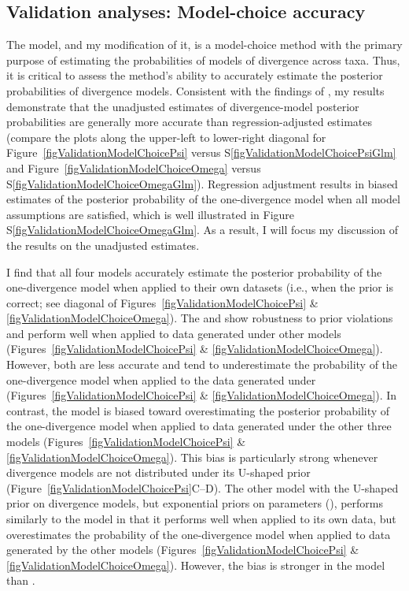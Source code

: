 \subsection{Validation analyses: Model-choice accuracy}
The \msb model, and my modification of it, is a model-choice method
with the primary purpose of estimating the probabilities of models
of divergence across taxa.
Thus, it is critical to assess the method's ability to accurately
estimate the posterior probabilities of divergence models.
Consistent with the findings of \citet{Oaks2012}, my results demonstrate that
the unadjusted estimates of divergence-model posterior probabilities are
generally more accurate than regression-adjusted estimates
(compare the plots along the upper-left to lower-right diagonal for
Figure~\ref{figValidationModelChoicePsi} versus
S\ref{figValidationModelChoicePsiGlm} and
Figure~\ref{figValidationModelChoiceOmega} versus
S\ref{figValidationModelChoiceOmegaGlm}).
Regression adjustment results in biased estimates of the posterior probability
of the one-divergence model when all model assumptions are satisfied, which is
well illustrated in Figure S\ref{figValidationModelChoiceOmegaGlm}.
As a result, I will focus my discussion of the results on the unadjusted
estimates.

I find that all four models accurately estimate the posterior probability of
the one-divergence model when applied to their own datasets (i.e., when the
prior is correct; see diagonal of Figures~\ref{figValidationModelChoicePsi} \&
\ref{figValidationModelChoiceOmega}).
The \modelUniform and \modelDPP show robustness to prior violations and
perform well when applied to data generated under other models
(Figures~\ref{figValidationModelChoicePsi} \&
\ref{figValidationModelChoiceOmega}).
However, both are less accurate and tend to underestimate the probability of the
one-divergence model when applied to the data generated under \modelUshaped
(Figures~\ref{figValidationModelChoicePsi} \&
\ref{figValidationModelChoiceOmega}).
In contrast, the \modelOld model is biased toward overestimating the posterior
probability of the one-divergence model when applied to data generated under
the other three models
(Figures~\ref{figValidationModelChoicePsi} \&
\ref{figValidationModelChoiceOmega}).
This bias is particularly strong whenever divergence models are not
distributed under its U-shaped prior
(Figure~\ref{figValidationModelChoicePsi}C--D).
The other model with the U-shaped prior on divergence models, but exponential
priors on parameters (\modelUshaped), performs similarly to the \modelOld model
in that it performs well when applied to its own data, but overestimates the
probability of the one-divergence model when applied to data generated by the
other models
(Figures~\ref{figValidationModelChoicePsi} \&
\ref{figValidationModelChoiceOmega}).
However, the bias is stronger in the \modelOld model than \modelUshaped.

